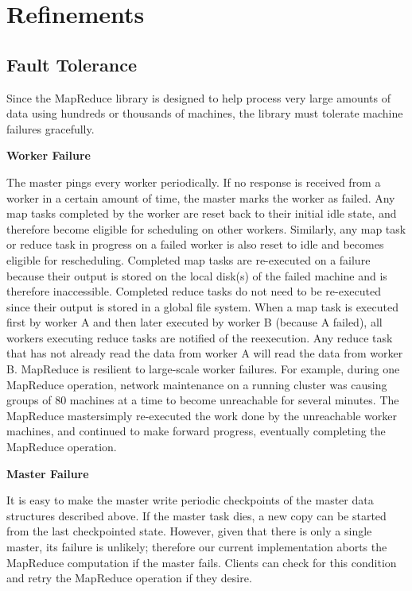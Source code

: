 \section {Refinements}
\subsection{Fault Tolerance}
Since the MapReduce library is designed to help process
very large amounts of data using hundreds or thousands
of machines, the library must tolerate machine failures
gracefully.

\vspace*{8pt}%
\textbf{Worker Failure}
\vspace*{8pt}%


The master pings every worker periodically. If no response is received from a worker in a certain amount of time, the master marks the worker as failed. Any map tasks completed by the worker are reset back to their initial
idle state, and therefore become eligible for scheduling
on other workers. Similarly, any map task or reduce
task in progress on a failed worker is also reset to idle
and becomes eligible for rescheduling.
Completed map tasks are re-executed on a failure because
their output is stored on the local disk(s) of the
failed machine and is therefore inaccessible. Completed
reduce tasks do not need to be re-executed since their
output is stored in a global file system.
When a map task is executed first by worker A and
then later executed by worker B (because A failed), all
workers executing reduce tasks are notified of the reexecution.
Any reduce task that has not already read the
data from worker A will read the data from worker B.
MapReduce is resilient to large-scale worker failures.
For example, during one MapReduce operation, network
maintenance on a running cluster was causing groups of
80 machines at a time to become unreachable for several
minutes. The MapReduce mastersimply re-executed
the work done by the unreachable worker machines, and
continued to make forward progress, eventually completing
the MapReduce operation.

\vspace*{8pt}%
\textbf{Master Failure}%
\vspace*{8pt}%

It is easy to make the master write periodic checkpoints
of the master data structures described above. If the master
task dies, a new copy can be started from the last
checkpointed state. However, given that there is only a
single master, its failure is unlikely; therefore our current
implementation aborts the MapReduce computation
if the master fails. Clients can check for this condition
and retry the MapReduce operation if they desire.